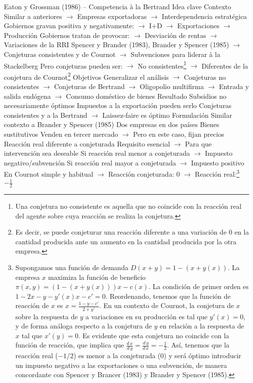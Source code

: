 \documentclass{nuevotema}
\begin{document}
\begin{esquemal}
		\2 Eaton y Grossman (1986) -- Competencia à la Bertrand
			\3 Idea clave
				\4 Contexto
				\4[] Similar a anteriores
				\4[] $\to$ Empresas exportadoras
				\4[] $\to$ Interdependencia estratégica
				\4[] Gobiernos gravan positiva y negativamente:
				\4[] $\to$ I+D
				\4[] $\to$ Exportaciones
				\4[] $\to$ Producción
				\4[] Gobiernos tratan de provocar:
				\4[] $\to$ Desviación de rentas
				\4[] $\to$ Variaciones de la RRI
				\4[] Spencer y Brander (1983), Brander y Spencer (1985)
				\4[] $\to$ Conjeturas consistentes y de Cournot
				\4[] $\to$ Subvenciones para liderar à la Stackelberg
				\4[] Pero conjeturas pueden ser:
				\4[] $\to$ No consistentes\footnote{Una conjetura no consistente es aquella que no coincide con la reacción real del agente sobre cuya reacción se realiza la conjetura.}
				\4[] $\to$ Diferentes de la conjetura de Cournot\footnote{Es decir, se puede conjeturar una reacción diferente a una variación de 0 en la cantidad producida ante un aumento en la cantidad producida por la otra empresa.}
				\4 Objetivos
				\4[] Generalizar el análisis
				\4[] $\to$ Conjeturas no consistentes
				\4[] $\to$ Conjeturas de Bertrand
				\4[] $\to$ Oligopolio multifirma
				\4[] $\to$ Entrada y salida endógena
				\4[] $\to$ Consumo doméstico de bienes
				\4 Resultado
				\4[] Subsidios no necesariamente óptimos
				\4[] Impuestos a la exportación pueden serlo
				\4[] Conjeturas consistentes y a la Bertrand
				\4[] $\to$ Laissez-faire es óptimo
			\3 Formulación
				\4 Similar contexto a Brander y Spencer (1985)
				\4[] Dos empresas en dos países
				\4[] Bienes sustitutivos
				\4[] Venden en tercer mercado
				\4[] $\to$ Pero en este caso, fijan precios
				\4 Reacción real diferente a conjeturada
				\4[] Requisito esencial
				\4[] $\to$ Para que intervención sea deseable
				\4[] Si reacción real menor a conjeturada
				\4[] $\to$ Impuesto negativo/subvención
				\4[] Si reacción real mayor a conjeturada
				\4[] $\to$ Impuesto positivo
				\4 En Cournot simple y habitual
				\4[] $\to$ Reacción conjeturada: 0
				\4[] $\to$ Reacción real:\footnote{Supongamos una función de demanda $D(x+y) = 1 -(x +y(x))$. La empresa $x$ maximiza la función de beneficio $\pi(x,y) = \left( 1 - (x+y(x)) \right) x - c(x) $. La condición de primer orden es $1 - 2x - y - y'(x) x - c' = 0$. Reordenando, tenemos que la función de reacción de $x$ es $x = \frac{1-y-c'}{2+y'}$. En un contexto de Cournot, la conjetura de $x$ sobre la respuesta de $y$ a variaciones en su producción es tal que $y'(x)=0$, y de forma análoga respecto a la conjetura de $y$ en relación a la respuesta de $x$ tal que $x'(y)=0$. Es evidente que esta conjetura no coincide con la función de reacción, que implica que $\frac{d \, x}{d \, y} = \frac{d \, y}{d \, x} = -\frac{1}{2}$. Así, tenemos que la reacción real ($-1/2$) es menor a la conjeturada ($0$) y será óptimo introducir un impuesto negativo a las exportaciones o una subvención, de manera concordante con Spencer y Brancer (1983) y Brander y Spencer (1985).} $-\frac{1}{2}$

\end{esquemal}
\end{document}
